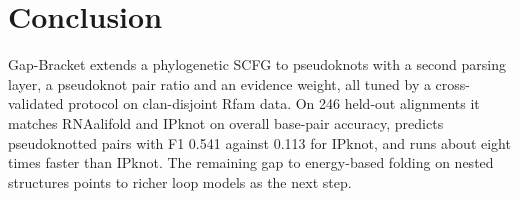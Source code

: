 \documentclass[10pt, twocolumn]{article}
\newcommand{\GB}{Gap-Bracket}
\begin{document}
\section{Conclusion}
\GB{} extends a phylogenetic SCFG to pseudoknots with a second parsing layer, a pseudoknot pair ratio and an evidence weight, all tuned by a cross-validated protocol on clan-disjoint Rfam data. On 246 held-out alignments it matches RNAalifold and IPknot on overall base-pair accuracy, predicts pseudoknotted pairs with F1 0.541 against 0.113 for IPknot, and runs about eight times faster than IPknot. The remaining gap to energy-based folding on nested structures points to richer loop models as the next step.


{\small\setlength{\itemsep}{0pt}}
\end{document}
